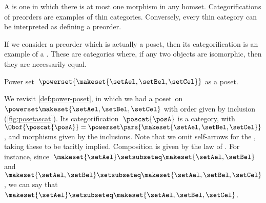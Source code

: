 \begin{remark}
    A  is one in which there is at most one morphism in any homset.
    Categorifications of preorders are examples of thin categories.
    Conversely, every thin category can be interpreted as defining a preorder.
\end{remark}

\begin{remark}
    If we consider a preorder which is actually a poset, then its categorification is an example of a .
    These are categories where, if any two objects are isomorphic, then they are necessarily equal.
\end{remark}

\begin{marginfigure}
    \centering
    \caption{Power set~$\powerset{\makeset{\setAel,\setBel,\setCel}}$ as a poset.
        \label{fig:posetascat}}
\end{marginfigure}

\begin{example}
    We revisit \cref{def:power-poset}, in which we had a poset~\posA on $\powerset \makeset{\setAel,\setBel,\setCel}$ with order given by inclusion (\cref{fig:posetascat}).
    Its categorification~$\poscat{\posA}$ is a category, with $\Obof{\poscat{\posA}}=\powerset\pars{\makeset{\setAel,\setBel,\setCel}}$, and morphisms given by the inclusions.
    Note that we omit self-arrows for the , taking these to be tacitly implied.
    Composition is given by the  law of .
    For instance, since~$\makeset{\setAel}\setsubseteq \makeset{\setAel,\setBel}$ and~$\makeset{\setAel,\setBel} \setsubseteq \makeset{\setAel,\setBel,\setCel}$, we can say that~$\makeset{\setAel}\setsubseteq \makeset{\setAel,\setBel,\setCel}$.
\end{example}